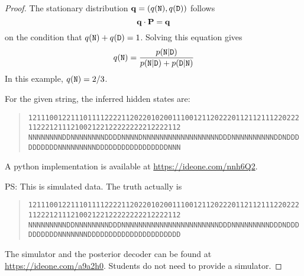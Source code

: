 \documentclass{article}[10pt]
\theoremstyle{definition}\newtheorem{question}{Question}
\begin{document}
\begin{proof}
The stationary distribution ${\bf q}=(q({\tt N}),q({\tt D}))$ follows
$$
{\bf q}\cdot{\bf P}={\bf q}
$$
on the condition that $q({\tt N})+q({\tt D})=1$. Solving this equation gives
$$
q({\tt N})=\frac{p({\tt N}|{\tt D})}{p({\tt N}|{\tt D}) + p({\tt D}|{\tt N})}
$$
In this example, $q({\tt N})=2/3$.

For the given string, the inferred hidden states are:
\begin{quote}
\footnotesize\tt 1211100122111011112222112022010200111001211202220112112111220222112221211121002122122222222212222112\\
\footnotesize\tt NNNNNNNNDDNNNNNNNNDDDDNNNNDNNNNNNNNNNNNNNNNNNDDDNNNNNNNNNNDDNDDDDDDDDDDNNNNNNNNNDDDDDDDDDDDDDDDDDNNN
\end{quote}
A python implementation is available at \href{https://ideone.com/nnh6Q2}{https://ideone.com/nnh6Q2}.

\begin{flushleft}
PS: This is simulated data. The truth actually is
\end{flushleft}
\begin{quote}
\footnotesize\tt 1211100122111011112222112022010200111001211202220112112111220222112221211121002122122222222212222112\\
\footnotesize\tt NNNNNNNNNDDNNNNNNNNDDDNNNNNNNNNNNNNNNNNNNNNNNDDDNNNNNNNNNDDDNDDDDDDDDDDNNNNNNNDDDDDDDDDDDDDDDDDDDDDD
\end{quote}

The simulator and the posterior decoder can be found at
\href{https://ideone.com/a9a2h0}{https://ideone.com/a9a2h0}. Students do not
need to provide a simulator.

\end{proof}
\end{document}
